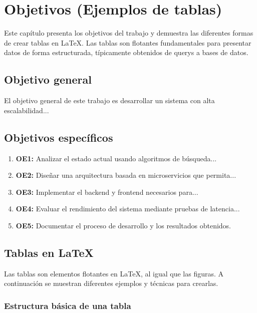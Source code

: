 \chapter{Objetivos (Ejemplos de tablas)}
\label{chap:objetivos}

Este capítulo presenta los objetivos del trabajo y demuestra las diferentes formas de crear tablas en \LaTeX{}. Las tablas son \glspl{flotante} fundamentales para presentar datos de forma estructurada, típicamente obtenidos de \glspl{query} a bases de datos.

\section{Objetivo general}
\label{sec:objetivo-general}

El objetivo general de este trabajo es desarrollar un sistema con alta \gls{escalabilidad}...

\section{Objetivos específicos}
\label{sec:objetivos-especificos}

\begin{enumerate}
  \item \textbf{OE1:} Analizar el estado actual usando \glspl{algoritmo} de búsqueda...
  \item \textbf{OE2:} Diseñar una arquitectura basada en \glspl{microservicio} que permita...
  \item \textbf{OE3:} Implementar el \gls{backend} y \gls{frontend} necesarios para...
  \item \textbf{OE4:} Evaluar el rendimiento del sistema mediante pruebas de \gls{latencia}...
  \item \textbf{OE5:} Documentar el proceso de desarrollo y los resultados obtenidos.
\end{enumerate}

\section{Tablas en LaTeX}
\label{sec:tablas-latex}

Las tablas son elementos flotantes en \LaTeX{}, al igual que las figuras. A continuación se muestran diferentes ejemplos y técnicas para crearlas.

\subsection{Estructura básica de una tabla}
\label{subsec:estructura-tabla}

